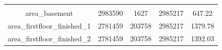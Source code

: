\documentclass[]{book}
\theoremstyle{definition}
\theoremstyle{definition}
\theoremstyle{definition}
\theoremstyle{remark}
\begin{document}
\begin{longtable}[]{@{}ccccc@{}}
\begin{minipage}[t]{0.12\columnwidth}
\end{minipage}\tabularnewline
\begin{minipage}[t]{0.35\columnwidth}\centering\strut
area\_basement\strut
\end{minipage} & \begin{minipage}[t]{0.12\columnwidth}\centering\strut
2983590\strut
\end{minipage} & \begin{minipage}[t]{0.13\columnwidth}\centering\strut
1627\strut
\end{minipage} & \begin{minipage}[t]{0.12\columnwidth}\centering\strut
2985217\strut
\end{minipage} & \begin{minipage}[t]{0.12\columnwidth}\centering\strut
647.22\strut
\end{minipage}\tabularnewline
\begin{minipage}[t]{0.35\columnwidth}\centering\strut
area\_firstfloor\_finished\_1\strut
\end{minipage} & \begin{minipage}[t]{0.12\columnwidth}\centering\strut
2781459\strut
\end{minipage} & \begin{minipage}[t]{0.13\columnwidth}\centering\strut
203758\strut
\end{minipage} & \begin{minipage}[t]{0.12\columnwidth}\centering\strut
2985217\strut
\end{minipage} & \begin{minipage}[t]{0.12\columnwidth}\centering\strut
1379.78\strut
\end{minipage}\tabularnewline
\begin{minipage}[t]{0.35\columnwidth}\centering\strut
area\_firstfloor\_finished\_2\strut
\end{minipage} & \begin{minipage}[t]{0.12\columnwidth}\centering\strut
2781459\strut
\end{minipage} & \begin{minipage}[t]{0.13\columnwidth}\centering\strut
203758\strut
\end{minipage} & \begin{minipage}[t]{0.12\columnwidth}\centering\strut
2985217\strut
\end{minipage} & \begin{minipage}[t]{0.12\columnwidth}\centering\strut
1392.03\strut
\end{minipage}\tabularnewline

\end{longtable}
\end{document}
